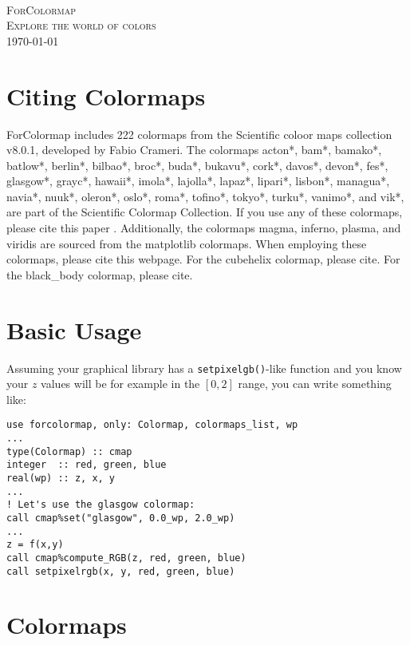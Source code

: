 \documentclass[a4paper]{article}
\begin{document}
\begin{titlepage}
	\centering
	\\
	\vspace{1cm}
	{\scshape\LARGE ForColormap}\\
	\vspace{1.5cm}
	{\scshape\Large Explore the world of colors}\\
	\vfill
	{\large \today}\\
\end{titlepage}
\newpage
\tableofcontents
\listoftables
\newpage
\section{Citing Colormaps}
ForColormap includes 222 colormaps from the Scientific coloor maps collection v8.0.1, developed by Fabio Crameri\cite{crameri_2023_8409685}. The colormaps acton*, bam*, bamako*, batlow*, berlin*, bilbao*, broc*, buda*, bukavu*, cork*, davos*, devon*, fes*, glasgow*, grayc*, hawaii*, imola*, lajolla*, lapaz*, lipari*, lisbon*, managua*, navia*, nuuk*, oleron*, oslo*, roma*, tofino*, tokyo*, turku*, vanimo*, and vik*, are part of the Scientific Colormap Collection. If you use any of these colormaps, please cite this paper \cite{Crameri2020}. Additionally, the colormaps magma, inferno, plasma, and viridis are sourced from the matplotlib colormaps. When employing these colormaps, please cite this webpage\cite{mpl_colormaps}. For the cubehelix colormap, please cite\cite{green2011colour}. For the black\_body colormap, please cite\cite{color_advice}.

\newpage
\section{Basic Usage}
Assuming your graphical library has a \texttt{setpixelgb()}-like function and you know your $z$ values will be for example in the $[0, 2]$ range, you can write something like:
\begin{lstlisting}[style=fortran]
use forcolormap, only: Colormap, colormaps_list, wp
...
type(Colormap) :: cmap
integer  :: red, green, blue
real(wp) :: z, x, y
...
! Let's use the glasgow colormap:
call cmap%set("glasgow", 0.0_wp, 2.0_wp)
...
z = f(x,y)
call cmap%compute_RGB(z, red, green, blue)
call setpixelrgb(x, y, red, green, blue)
\end{lstlisting}
\newpage
\section{Colormaps}
\end{document}
